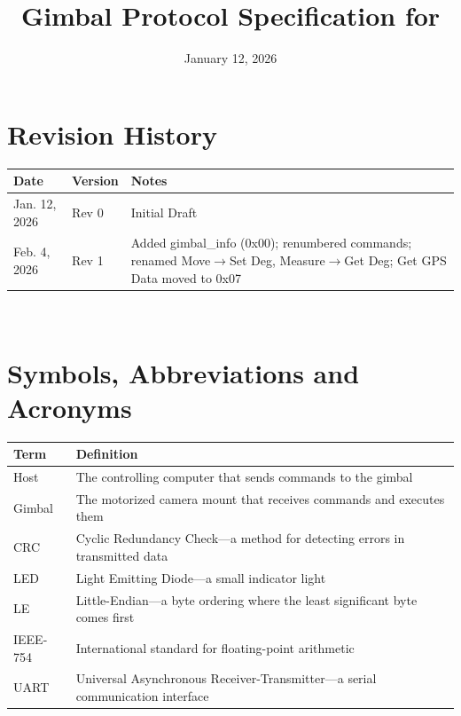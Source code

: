 \documentclass[12pt, titlepage]{article}
\begin{document}
\title{Gimbal Protocol Specification for \progname{}}
\author{\authname}
\date{January 12, 2026}

\maketitle


\section{Revision History}

\begin{tabularx}{\textwidth}{p{3cm}p{2cm}X}
  \toprule {\bf Date} & {\bf Version} & {\bf Notes}                                                                                                               \\
  \midrule
  Jan. 12, 2026       & Rev 0         & Initial Draft                                                                                                             \\
  Feb. 4, 2026        & Rev 1         & Added gimbal\_info (0x00); renumbered commands; renamed Move$\to$Set Deg, Measure$\to$Get Deg; Get GPS Data moved to 0x07 \\
  \bottomrule
\end{tabularx}

~\newpage

\section{Symbols, Abbreviations and Acronyms}

\begin{tabularx}{\textwidth}{p{3cm}X}
  \toprule {\bf Term} & {\bf Definition}                                                               \\
  \midrule
  Host                & The controlling computer that sends commands to the gimbal                     \\
  Gimbal              & The motorized camera mount that receives commands and executes them            \\
  CRC                 & Cyclic Redundancy Check---a method for detecting errors in transmitted data    \\
  LED                 & Light Emitting Diode---a small indicator light                                 \\
  LE                  & Little-Endian---a byte ordering where the least significant byte comes first   \\
  IEEE-754            & International standard for floating-point arithmetic                           \\
  UART                & Universal Asynchronous Receiver-Transmitter---a serial communication interface \\
  \bottomrule
\end{tabularx}
\end{document}
